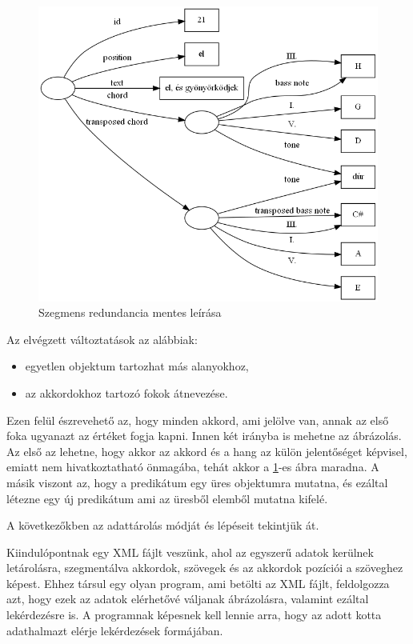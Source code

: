 \begin{figure}[h]
	\includegraphics[scale=0.5]{images/img_src/rdf_graph_7.png}
	\caption{Szegmens redundancia mentes leírása}
	\label{fig:graph7}
\end{figure}

Az elvégzett változtatások az alábbiak:
\begin{itemize}
	\item egyetlen objektum tartozhat más alanyokhoz,
	\item az akkordokhoz tartozó fokok átnevezése.
\end{itemize}

Ezen felül észrevehető az, hogy minden akkord, ami jelölve van, annak az első foka ugyanazt az értéket fogja kapni. Innen két irányba is mehetne az ábrázolás. Az első az lehetne, hogy akkor az akkord és a hang az külön jelentőséget képvisel, emiatt nem hivatkoztatható önmagába, tehát akkor a \ref{fig:graph7}-es ábra maradna. A másik viszont az, hogy a predikátum egy üres objektumra mutatna, és ezáltal létezne egy új predikátum ami az üresből elemből mutatna kifelé.


A következőkben az adattárolás módját és lépéseit tekintjük át.


Kiindulópontnak egy XML fájlt veszünk, ahol az egyszerű adatok kerülnek letárolásra, szegmentálva akkordok, szövegek és az akkordok pozíciói a szöveghez képest. Ehhez társul egy olyan program, ami betölti az XML fájlt, feldolgozza azt, hogy ezek az adatok elérhetővé váljanak ábrázolásra, valamint ezáltal lekérdezésre is. A programnak képesnek kell lennie arra, hogy az adott kotta adathalmazt elérje lekérdezések formájában.

